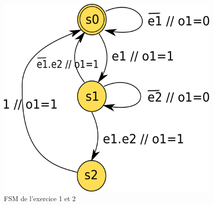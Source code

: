 \documentclass[a4paper,11pt]{article}
\begin{document}
\begin{figure}[!h]
\begin{center}
\includegraphics[scale=0.3]{./figures/ex-fsm-1.png}
\end{center}
\caption{FSM de l'exercice 1 et 2}
\label{fig2}
\end{figure}
\end{document}

